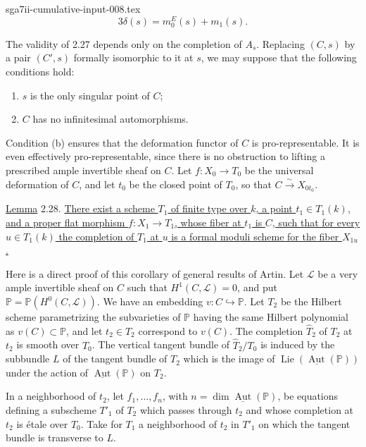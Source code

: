 \begin{filecontents*}{sga7ii-cumulative-input-008.tex}
\begin{equation*}
3\delta(s)=m_0^E(s)+m_1(s).
\end{equation*}


The validity of 2.27 depends only on the completion of $A_s$.  Replacing
$(C,s)$ by a pair $(C',s)$ formally isomorphic to it at $s$, we may suppose
that the following conditions hold:

\begin{enumerate}[label=(\alph*),leftmargin=1.2cm]
\item $s$ is the only singular point of $C$;
\item $C$ has no infinitesimal automorphisms.
\end{enumerate}

Condition (b) ensures that the deformation functor of $C$ is pro-representable.
It is even effectively pro-representable, since there is no obstruction to
lifting a prescribed ample invertible sheaf on $C$.  Let
$f:X_0\longrightarrow T_0$ be the universal deformation of $C$, and let $t_0$
be the closed point of $T_0$, so that $C\overset\sim\longrightarrow X_{0t_0}$.

\underline{Lemma} 2.28. \underline{There exist a scheme $T_1$ of finite type
over $k$, a point $t_1\in T_1(k)$, and a proper flat morphism
$f:X_1\longrightarrow T_1$, whose fiber at $t_1$ is $C$, such that for every
$u\in T_1(k)$ the completion of $T_1$ at $u$ is a formal moduli scheme for the
fiber $X_{1u}$.}

Here is a direct proof of this corollary of general results of Artin.  Let
$\mathcal L$ be a very ample invertible sheaf on $C$ such that
$H^1(C,\mathcal L)=0$, and put
$\mathbb P=\mathbb P(H^0(C,\mathcal L))$.  We have an embedding
$v:C\hookrightarrow\mathbb P$.  Let $T_2$ be the Hilbert scheme parametrizing
the subvarieties of $\mathbb P$ having the same Hilbert polynomial as
$v(C)\subset\mathbb P$, and let $t_2\in T_2$ correspond to $v(C)$.  The
completion $\widehat T_2$ of $T_2$ at $t_2$ is smooth over $T_0$.  The vertical
tangent bundle of $\widehat T_2/T_0$ is induced by the subbundle $L$ of the
tangent bundle of $T_2$ which is the image of
$\operatorname{Lie}(\underline{\operatorname{Aut}}(\mathbb P))$ under the
action of $\underline{\operatorname{Aut}}(\mathbb P)$ on $T_2$.

In a neighborhood of $t_2$, let $f_1,\ldots,f_n$, with
$n=\dim\underline{\operatorname{Aut}}(\mathbb P)$, be equations defining a
subscheme $T'_1$ of $T_2$ which passes through $t_2$ and whose completion at
$t_2$ is étale over $T_0$.  Take for $T_1$ a neighborhood of $t_2$ in $T'_1$
on which the tangent bundle is transverse to $L$.


\end{filecontents*}
